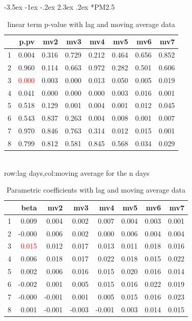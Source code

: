 \documentclass[a4paper, 12pt]{article}
\makeatletter
\def\large{\fontsize{14}{20}\selectfont}
\renewcommand\subsection{\@startsection {subsection}{1}{\z@}%
                                   {-3.5ex \@plus -1ex \@minus -.2ex}%
                                   {2.3ex \@plus.2ex}%
                                   {\centering\normalfont\large\bfseries}}
\makeatother
\begin{document}
\subsection*{PM2.5}
\begin{table}[h]
\centering
\caption{linear term p-value with lag and moving average data}
\begin{tabular}{rrrrrrrr}
  \hline
 & p.pv & mv2 & mv3 & mv4 & mv5 & mv6 & mv7 \\
  \hline
1 & 0.004 & 0.316 & 0.729 & 0.212 & 0.464 & 0.656 & 0.852 \\
  2 & 0.960 & 0.114 & 0.663 & 0.972 & 0.282 & 0.501 & 0.606 \\
  3 & \textcolor{red}{0.000} & 0.003 & 0.000 & 0.013 & 0.050 & 0.005 & 0.019 \\
  4 & 0.041 & 0.000 & 0.000 & 0.000 & 0.003 & 0.016 & 0.001 \\
  5 & 0.518 & 0.129 & 0.001 & 0.004 & 0.001 & 0.012 & 0.045 \\
  6 & 0.543 & 0.837 & 0.263 & 0.004 & 0.008 & 0.001 & 0.007 \\
  7 & 0.970 & 0.846 & 0.763 & 0.314 & 0.012 & 0.015 & 0.001 \\
  8 & 0.799 & 0.812 & 0.581 & 0.845 & 0.568 & 0.034 & 0.029 \\
   \hline
\end{tabular}
\\row:lag days,col:moving average for the n days
\end{table}

\begin{table}[h]
\centering
\caption{Parametric coefficients with lag and moving average data}
\begin{tabular}{rrrrrrrr}
  \hline
 & beta & mv2 & mv3 & mv4 & mv5 & mv6 & mv7 \\
  \hline
1 & 0.009 & 0.004 & 0.002 & 0.007 & 0.004 & 0.003 & 0.001 \\
  2 & -0.000 & 0.006 & 0.002 & 0.000 & 0.006 & 0.004 & 0.004 \\
  3 & \textcolor{red}{0.015} & 0.012 & 0.017 & 0.013 & 0.011 & 0.018 & 0.016 \\
  4 & 0.006 & 0.018 & 0.017 & 0.022 & 0.018 & 0.015 & 0.022 \\
  5 & 0.002 & 0.006 & 0.016 & 0.015 & 0.020 & 0.016 & 0.014 \\
  6 & -0.002 & 0.001 & 0.005 & 0.015 & 0.016 & 0.022 & 0.019 \\
  7 & -0.000 & -0.001 & 0.001 & 0.005 & 0.015 & 0.016 & 0.023 \\
  8 & 0.001 & -0.001 & -0.003 & -0.001 & 0.003 & 0.014 & 0.015 \\
   \hline
\end{tabular}
\end{table}
\clearpage
\end{document}
